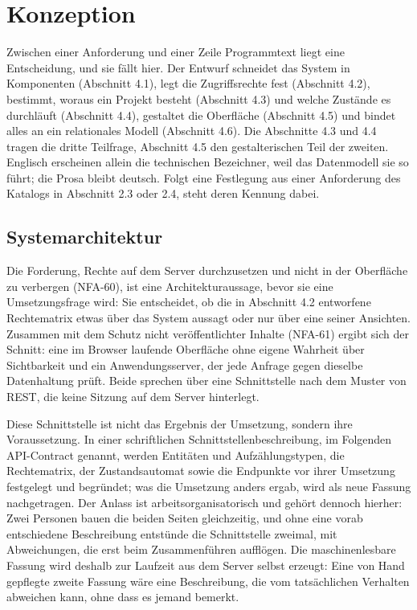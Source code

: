 
\chapter{Konzeption}
\label{kap:konzeption}

Zwischen einer Anforderung und einer Zeile Programmtext liegt eine Entscheidung, und sie fällt hier. Der Entwurf schneidet das System in Komponenten (Abschnitt 4.1), legt die Zugriffsrechte fest (Abschnitt 4.2), bestimmt, woraus ein Projekt besteht (Abschnitt 4.3) und welche Zustände es durchläuft (Abschnitt 4.4), gestaltet die Oberfläche (Abschnitt 4.5) und bindet alles an ein relationales Modell (Abschnitt 4.6). Die Abschnitte 4.3 und 4.4 tragen die dritte Teilfrage, Abschnitt 4.5 den gestalterischen Teil der zweiten. Englisch erscheinen allein die technischen Bezeichner, weil das Datenmodell sie so führt; die Prosa bleibt deutsch. Folgt eine Festlegung aus einer Anforderung des Katalogs in Abschnitt 2.3 oder 2.4, steht deren Kennung dabei.

\section{Systemarchitektur}
\label{sec:systemarchitektur}

Die Forderung, Rechte auf dem Server durchzusetzen und nicht in der Oberfläche zu verbergen (NFA-60), ist eine Architekturaussage, bevor sie eine Umsetzungsfrage wird: Sie entscheidet, ob die in Abschnitt 4.2 entworfene Rechtematrix etwas über das System aussagt oder nur über eine seiner Ansichten. Zusammen mit dem Schutz nicht veröffentlichter Inhalte (NFA-61) ergibt sich der Schnitt: eine im Browser laufende Oberfläche ohne eigene Wahrheit über Sichtbarkeit und ein Anwendungsserver, der jede Anfrage gegen dieselbe Datenhaltung prüft. Beide sprechen über eine Schnittstelle nach dem Muster von REST, die keine Sitzung auf dem Server hinterlegt.

Diese Schnittstelle ist nicht das Ergebnis der Umsetzung, sondern ihre Voraussetzung. In einer schriftlichen Schnittstellenbeschreibung, im Folgenden API-Contract genannt, werden Entitäten und Aufzählungstypen, die Rechtematrix, der Zustandsautomat sowie die Endpunkte vor ihrer Umsetzung festgelegt und begründet; was die Umsetzung anders ergab, wird als neue Fassung nachgetragen. Der Anlass ist arbeitsorganisatorisch und gehört dennoch hierher: Zwei Personen bauen die beiden Seiten gleichzeitig, und ohne eine vorab entschiedene Beschreibung entstünde die Schnittstelle zweimal, mit Abweichungen, die erst beim Zusammenführen aufflögen. Die maschinenlesbare Fassung wird deshalb zur Laufzeit aus dem Server selbst erzeugt: Eine von Hand gepflegte zweite Fassung wäre eine Beschreibung, die vom tatsächlichen Verhalten abweichen kann, ohne dass es jemand bemerkt.

